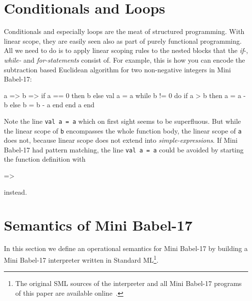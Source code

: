 \documentclass{llncs}
\newcommand{\bsrc}[1] {\lstinline!#1!}
\begin{document}
\section{Conditionals and Loops}
Conditionals and especially loops are the meat of structured programming. With linear scope, they are easily seen also as part of purely functional programming. All we need to do is to apply linear scoping rules to the nested blocks that the \emph{if}-, \emph{while-} and \emph{for-statements} consist of. For example, this is how you can encode the subtraction based Euclidean algorithm for two non-negative integers in Mini Babel-17:
\begin{babellisting}
a => b =>
    if a == 0 then
      b
    else 
      val a = a
      while b != 0 do
        if a > b then
          a = a - b
        else
          b = b - a
        end
      end
      a
    end
\end{babellisting}
Note the line \bsrc{val a = a} which on first sight seems to be superfluous. But while the linear scope of \bsrc{b} encompasses the whole
function body, the linear scope of \bsrc{a} does not, because linear scope does not extend into \emph{simple-expressions}.
If Mini Babel-17 had pattern matching, the line \bsrc{val a = a} could be avoided by starting the function definition with 
\begin{babellisting}
[a,  b] =>
    
\end{babellisting}
instead.

\section{Semantics of Mini Babel-17}
In this section we define an operational semantics for Mini Babel-17 by building a Mini Babel-17 interpreter written in Standard ML\footnote{
The original SML sources of the interpreter and all Mini Babel-17 programs of this paper are available online~\cite{babel17}.}. 
\end{document}
